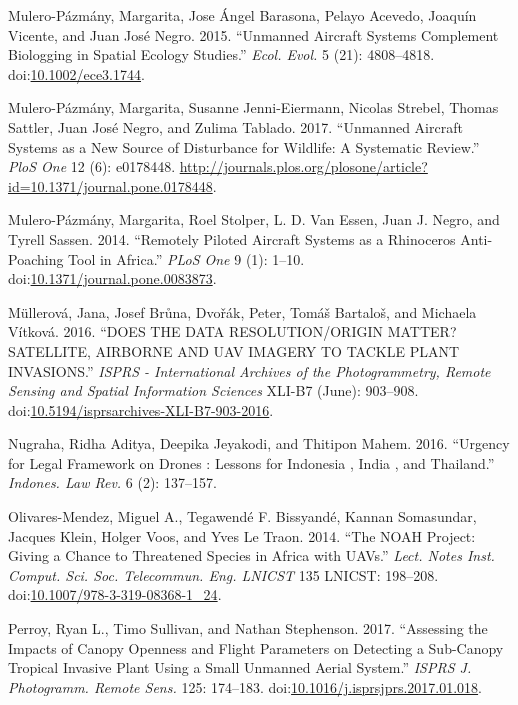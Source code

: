 \documentclass[]{interact}
\theoremstyle{plain}%
\theoremstyle{definition}
\theoremstyle{remark}
\begin{document}
\hypertarget{ref-mulero-pazmany_unmanned_2015}{}
Mulero-Pázmány, Margarita, Jose Ángel Barasona, Pelayo Acevedo, Joaquín
Vicente, and Juan José Negro. 2015. ``Unmanned Aircraft Systems
Complement Biologging in Spatial Ecology Studies.'' \emph{Ecol. Evol.} 5
(21): 4808--4818.
doi:\href{https://doi.org/10.1002/ece3.1744}{10.1002/ece3.1744}.

\hypertarget{ref-mulero-pazmany_unmanned_2017}{}
Mulero-Pázmány, Margarita, Susanne Jenni-Eiermann, Nicolas Strebel,
Thomas Sattler, Juan José Negro, and Zulima Tablado. 2017. ``Unmanned
Aircraft Systems as a New Source of Disturbance for Wildlife: A
Systematic Review.'' \emph{PloS One} 12 (6): e0178448.
\url{http://journals.plos.org/plosone/article?id=10.1371/journal.pone.0178448}.

\hypertarget{ref-mulero-pazmany_remotely_2014}{}
Mulero-Pázmány, Margarita, Roel Stolper, L. D. Van Essen, Juan J. Negro,
and Tyrell Sassen. 2014. ``Remotely Piloted Aircraft Systems as a
Rhinoceros Anti-Poaching Tool in Africa.'' \emph{PLoS One} 9 (1): 1--10.
doi:\href{https://doi.org/10.1371/journal.pone.0083873}{10.1371/journal.pone.0083873}.

\hypertarget{ref-mullerova_does_2016}{}
Müllerová, Jana, Josef Brůna, Dvořák, Peter, Tomáš Bartaloš, and
Michaela Vítková. 2016. ``DOES THE DATA RESOLUTION/ORIGIN MATTER?
SATELLITE, AIRBORNE AND UAV IMAGERY TO TACKLE PLANT INVASIONS.''
\emph{ISPRS - International Archives of the Photogrammetry, Remote
Sensing and Spatial Information Sciences} XLI-B7 (June): 903--908.
doi:\href{https://doi.org/10.5194/isprsarchives-XLI-B7-903-2016}{10.5194/isprsarchives-XLI-B7-903-2016}.

\hypertarget{ref-nugraha_urgency_2016}{}
Nugraha, Ridha Aditya, Deepika Jeyakodi, and Thitipon Mahem. 2016.
``Urgency for Legal Framework on Drones : Lessons for Indonesia , India
, and Thailand.'' \emph{Indones. Law Rev.} 6 (2): 137--157.

\hypertarget{ref-olivares-mendez_noah_2014}{}
Olivares-Mendez, Miguel A., Tegawendé F. Bissyandé, Kannan Somasundar,
Jacques Klein, Holger Voos, and Yves Le Traon. 2014. ``The NOAH Project:
Giving a Chance to Threatened Species in Africa with UAVs.'' \emph{Lect.
Notes Inst. Comput. Sci. Soc. Telecommun. Eng. LNICST} 135 LNICST:
198--208.
doi:\href{https://doi.org/10.1007/978-3-319-08368-1_24}{10.1007/978-3-319-08368-1\_24}.

\hypertarget{ref-perroy_assessing_2017}{}
Perroy, Ryan L., Timo Sullivan, and Nathan Stephenson. 2017. ``Assessing
the Impacts of Canopy Openness and Flight Parameters on Detecting a
Sub-Canopy Tropical Invasive Plant Using a Small Unmanned Aerial
System.'' \emph{ISPRS J. Photogramm. Remote Sens.} 125: 174--183.
doi:\href{https://doi.org/10.1016/j.isprsjprs.2017.01.018}{10.1016/j.isprsjprs.2017.01.018}.
\end{document}

